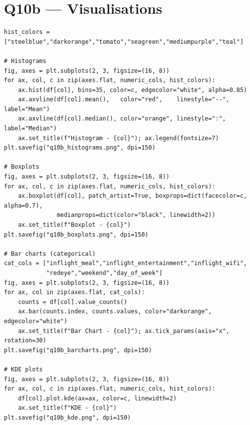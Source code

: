 \documentclass[12pt, a4paper]{report}
\begin{document}
\section{Q10b — Visualisations}

\begin{lstlisting}[style=python, caption={Python — Histograms, boxplots, bar charts, and KDE plots}]
hist_colors = ["steelblue","darkorange","tomato","seagreen","mediumpurple","teal"]

# Histograms
fig, axes = plt.subplots(2, 3, figsize=(16, 8))
for ax, col, c in zip(axes.flat, numeric_cols, hist_colors):
    ax.hist(df[col], bins=35, color=c, edgecolor="white", alpha=0.85)
    ax.axvline(df[col].mean(),   color="red",    linestyle="--", label="Mean")
    ax.axvline(df[col].median(), color="orange", linestyle=":",  label="Median")
    ax.set_title(f"Histogram - {col}"); ax.legend(fontsize=7)
plt.savefig("q10b_histograms.png", dpi=150)

# Boxplots
fig, axes = plt.subplots(2, 3, figsize=(16, 8))
for ax, col, c in zip(axes.flat, numeric_cols, hist_colors):
    ax.boxplot(df[col], patch_artist=True, boxprops=dict(facecolor=c, alpha=0.7),
               medianprops=dict(color="black", linewidth=2))
    ax.set_title(f"Boxplot - {col}")
plt.savefig("q10b_boxplots.png", dpi=150)

# Bar charts (categorical)
cat_cols = ["inflight_meal","inflight_entertainment","inflight_wifi",
            "redeye","weekend","day_of_week"]
fig, axes = plt.subplots(2, 3, figsize=(16, 8))
for ax, col in zip(axes.flat, cat_cols):
    counts = df[col].value_counts()
    ax.bar(counts.index, counts.values, color="darkorange", edgecolor="white")
    ax.set_title(f"Bar Chart - {col}"); ax.tick_params(axis="x", rotation=30)
plt.savefig("q10b_barcharts.png", dpi=150)

# KDE plots
fig, axes = plt.subplots(2, 3, figsize=(16, 8))
for ax, col, c in zip(axes.flat, numeric_cols, hist_colors):
    df[col].plot.kde(ax=ax, color=c, linewidth=2)
    ax.set_title(f"KDE - {col}")
plt.savefig("q10b_kde.png", dpi=150)
\end{lstlisting}
\end{document}
